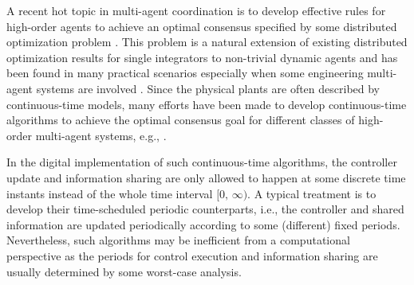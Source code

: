 \documentclass[sort&compress]{IEEEtran}
\begin{document}
A recent hot topic in multi-agent coordination is to develop effective rules for high-order agents  to achieve an optimal consensus specified by some distributed optimization problem \cite{yang2019survey}. This problem is a natural extension of existing distributed optimization results for single integrators to non-trivial dynamic agents and has been found in many practical scenarios especially when some engineering  multi-agent systems are involved \cite{li2014cooperative, zhang2017distributed}. Since the physical plants are often described by continuous-time models, many efforts have been made to develop continuous-time algorithms to achieve the optimal consensus goal for  different classes of high-order multi-agent systems, e.g., \cite{xie2017global, tang2019optimal, tang2021optimal, an2021distributed, wang2020distributed, liu2022new, li2022exponential}.

In the digital implementation of such continuous-time algorithms,  the controller update and information sharing are only allowed to happen at some discrete time instants instead of the whole time interval $[0,\,\infty)$. A typical treatment is to develop their time-scheduled periodic counterparts, i.e., the controller and shared information are updated periodically according to some (different) fixed periods.  Nevertheless, such algorithms may be inefficient from a computational perspective as the periods for control execution and information sharing are usually determined by some worst-case analysis. %
\end{document}
